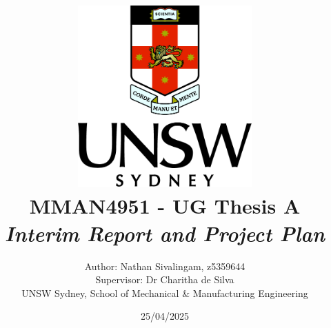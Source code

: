 \title{
    \includegraphics[width=0.5\textwidth]{Figures/unsw_crest.jpg}\\ \vspace{10mm}
    \textbf{MMAN4951 - UG Thesis A\\ 
    \textit{Interim Report and Project Plan\vspace{6mm}}}
    } 
\author{Author: Nathan Sivalingam, z5359644 \vspace{2mm} \\ Supervisor: Dr Charitha de Silva\vspace{4mm} \\ UNSW Sydney, School of Mechanical \& Manufacturing Engineering}
\date{25/04/2025} %

\maketitle

\pagebreak

\pagebreak

